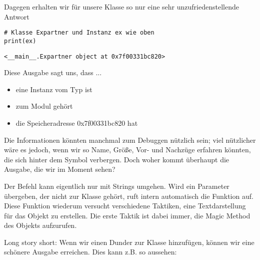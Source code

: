 Dagegen erhalten wir für unsere Klasse so nur eine sehr unzufriedenstellende Antwort
\begin{codebox}
\begin{verbatim}
# Klasse Expartner und Instanz ex wie oben
print(ex)
\end{verbatim}
\end{codebox}
\begin{cmdbox}
\begin{verbatim}
<__main__.Expartner object at 0x7f00331bc820>
\end{verbatim}
\end{cmdbox}

Diese Ausgabe sagt uns, dass  ...
\begin{itemize}
\item eine Instanz vom Typ  ist
\item zum Modul  gehört
\item die Speicheradresse 0x7f00331bc820 hat
\end{itemize}
Die Informationen könnten manchmal zum Debuggen nützlich sein; viel nützlicher wäre es jedoch, wenn wir so Name, Größe, Vor- und Nachzüge erfahren könnten, die sich hinter dem Symbol  verbergen. Doch woher kommt überhaupt die Ausgabe, die wir im Moment sehen?

Der Befehl  kann eigentlich nur mit Strings umgehen. Wird ein Parameter übergeben, der nicht zur Klasse  gehört, ruft  intern automatisch die Funktion  auf. Diese Funktion wiederum versucht verschiedene Taktiken, eine Textdarstellung für das Objekt zu erstellen. Die erste Taktik ist dabei immer, die Magic Method  des Objekts aufzurufen.

Long story short: Wenn wir einen Dunder  zur Klasse hinzufügen, können wir eine schönere Ausgabe erreichen. Dies kann z.B. so aussehen:

